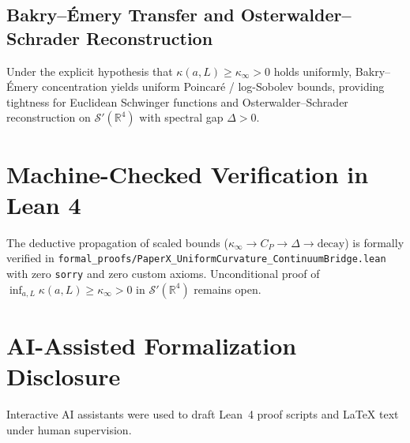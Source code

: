 \documentclass[11pt,a4paper]{article}
\begin{document}
\subsection{Bakry--\'Emery Transfer and Osterwalder--Schrader Reconstruction}
Under the explicit hypothesis that $\kappa(a, L) \ge \kappa_\infty > 0$ holds uniformly, Bakry--\'Emery concentration yields uniform Poincar\'e / log-Sobolev bounds, providing tightness for Euclidean Schwinger functions and Osterwalder--Schrader reconstruction on $\mathcal{S}'(\mathbb{R}^4)$ with spectral gap $\Delta > 0$.

\section{Machine-Checked Verification in Lean 4}
The deductive propagation of scaled bounds ($\kappa_\infty \to C_P \to \Delta \to \text{decay}$) is formally verified in \texttt{formal\_proofs/PaperX\_UniformCurvature\_ContinuumBridge.lean} with zero \texttt{sorry} and zero custom axioms. Unconditional proof of $\inf_{a,L}\kappa(a,L) \ge \kappa_\infty > 0$ in $\mathcal{S}'(\mathbb{R}^4)$ remains open.

\section{AI-Assisted Formalization Disclosure}
Interactive AI assistants were used to draft Lean~4 proof scripts and LaTeX text under human supervision.
\end{document}
